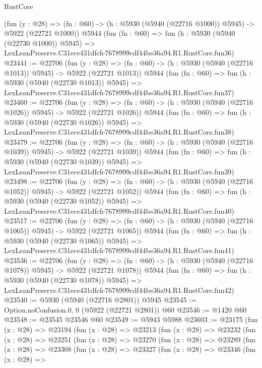 \begin{lexlean}{RustCore}
\begin{coremodule}
    (fun (y : @28) =>
    (fn : @60) -> (h : @5930 (@5940 (@22716 @1000)) @5945) -> @5922 (@22721 @1000))
    @5944
    (fun (fn : @60) =>
    fun (h : @5930 (@5940 (@22730 @1000)) @5945) =>
    LexLeanPreserve.C31ece431dfcfc7678999cdf44be36a94.R1.RustCore.fun36)
@23441 := @22706
    (fun (y : @28) =>
    (fn : @60) -> (h : @5930 (@5940 (@22716 @1013)) @5945) -> @5922 (@22721 @1013))
    @5944
    (fun (fn : @60) =>
    fun (h : @5930 (@5940 (@22730 @1013)) @5945) =>
    LexLeanPreserve.C31ece431dfcfc7678999cdf44be36a94.R1.RustCore.fun37)
@23460 := @22706
    (fun (y : @28) =>
    (fn : @60) -> (h : @5930 (@5940 (@22716 @1026)) @5945) -> @5922 (@22721 @1026))
    @5944
    (fun (fn : @60) =>
    fun (h : @5930 (@5940 (@22730 @1026)) @5945) =>
    LexLeanPreserve.C31ece431dfcfc7678999cdf44be36a94.R1.RustCore.fun38)
@23479 := @22706
    (fun (y : @28) =>
    (fn : @60) -> (h : @5930 (@5940 (@22716 @1039)) @5945) -> @5922 (@22721 @1039))
    @5944
    (fun (fn : @60) =>
    fun (h : @5930 (@5940 (@22730 @1039)) @5945) =>
    LexLeanPreserve.C31ece431dfcfc7678999cdf44be36a94.R1.RustCore.fun39)
@23498 := @22706
    (fun (y : @28) =>
    (fn : @60) -> (h : @5930 (@5940 (@22716 @1052)) @5945) -> @5922 (@22721 @1052))
    @5944
    (fun (fn : @60) =>
    fun (h : @5930 (@5940 (@22730 @1052)) @5945) =>
    LexLeanPreserve.C31ece431dfcfc7678999cdf44be36a94.R1.RustCore.fun40)
@23517 := @22706
    (fun (y : @28) =>
    (fn : @60) -> (h : @5930 (@5940 (@22716 @1065)) @5945) -> @5922 (@22721 @1065))
    @5944
    (fun (fn : @60) =>
    fun (h : @5930 (@5940 (@22730 @1065)) @5945) =>
    LexLeanPreserve.C31ece431dfcfc7678999cdf44be36a94.R1.RustCore.fun41)
@23536 := @22706
    (fun (y : @28) =>
    (fn : @60) -> (h : @5930 (@5940 (@22716 @1078)) @5945) -> @5922 (@22721 @1078))
    @5944
    (fun (fn : @60) =>
    fun (h : @5930 (@5940 (@22730 @1078)) @5945) =>
    LexLeanPreserve.C31ece431dfcfc7678999cdf44be36a94.R1.RustCore.fun42)
@23540 := @5930 (@5940 (@22716 @2801)) @5945
@23545 := Option.noConfusion.{0, 0} (@5922 (@22721 @2801)) @60
@23546 := @1420 @60
@23548 := @23545 @23546 @60
@23549 := @5943 @5988
@23603 := @23175
    (fun (x : @28) =>
    @23194
      (fun (x : @28) =>
      @23213
        (fun (x : @28) =>
        @23232
          (fun (x : @28) =>
          @23251
            (fun (x : @28) =>
            @23270
              (fun (x : @28) =>
              @23289
                (fun (x : @28) =>
                @23308
                  (fun (x : @28) =>
                  @23327
                    (fun (x : @28) =>
                    @23346
                      (fun (x : @28) =>

\end{coremodule}
\end{lexlean}
